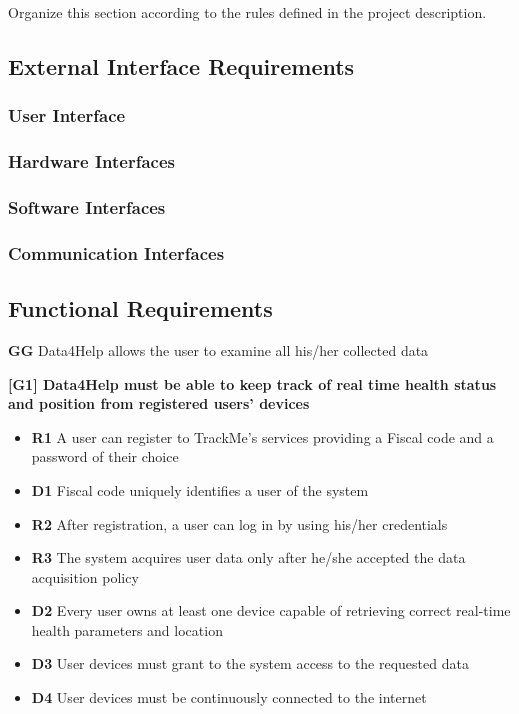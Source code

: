 Organize this section according to the rules defined in the project description. 
\subsection{External Interface Requirements}
\subsubsection{User Interface}
\subsubsection{Hardware Interfaces}
\subsubsection{Software Interfaces}
\subsubsection{Communication Interfaces}
\subsection{Functional Requirements}
\textbf{GG} Data4Help allows the user to examine all his/her collected data

\textbf{[G1] Data4Help must be able to keep track of real time health status and position from registered users' devices}
\begin{itemize}
\item \textbf{R1} A user can register to TrackMe's services providing a Fiscal code and a password of their choice
\item \textbf{D1} Fiscal code uniquely identifies a user of the system
\item \textbf{R2} After registration, a user can log in by using his/her credentials
\item \textbf{R3} The system acquires user data only after he/she accepted the data acquisition policy
\item \textbf{D2} Every user owns at least one device capable of retrieving correct real-time health parameters and location
\item \textbf{D3} User devices must grant to the system access to the requested data
\item \textbf{D4} User devices must be continuously connected to the internet
\end{itemize}

